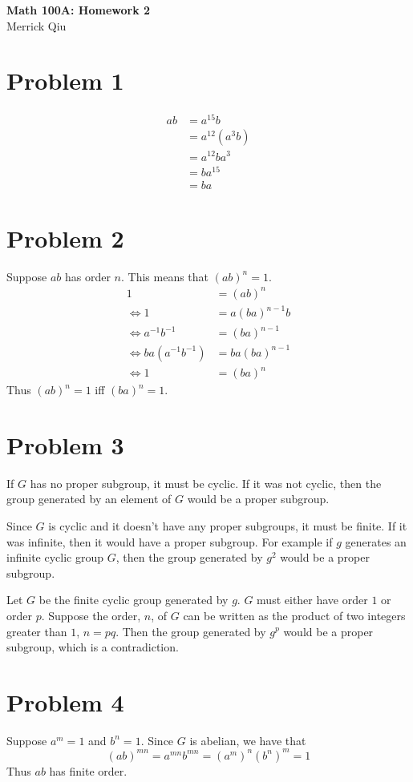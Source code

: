 \documentclass{article}
\begin{document}
\begin{center}
	\huge{\bf Math 100A: Homework 2} \\
	Merrick Qiu
\end{center}

\section*{Problem 1}
\begin{align*}
	ab &= a^{15}b \\
	&= a^{12}(a^3b) \\
	&= a^{12}ba^3 \\
	&= ba^{15} \\
	&= ba
\end{align*}

\section*{Problem 2}
Suppose $ab$ has order $n$. 
This means that $(ab)^n = 1$.
\begin{align*}
	1 &= (ab)^n \\
	\iff 1 &= a(ba)^{n-1}b \\
	\iff a^{-1}b^{-1} &= (ba)^{n-1} \\
	\iff ba(a^{-1}b^{-1}) &= ba(ba)^{n-1} \\
	\iff 1 &= (ba)^n
\end{align*}
Thus $(ab)^n = 1$ iff $(ba)^n = 1$.

\section*{Problem 3}
If $G$ has no proper subgroup, it must be cyclic.
If it was not cyclic, then the group generated by an element of $G$
would be a proper subgroup.

Since $G$ is cyclic and it doesn't have any proper subgroups, it must be finite.
If it was infinite, then it would have a proper subgroup.
For example if $g$ generates an infinite cyclic group $G$, then the group generated by $g^2$ 
would be a proper subgroup.

Let $G$ be the finite cyclic group generated by $g$.
$G$ must either have order $1$ or order $p$.
Suppose the order, $n$, of $G$ can be written as the product of two integers greater than $1$,
$n=pq$.
Then the group generated by $g^p$ would be a proper subgroup,
which is a contradiction.

\section*{Problem 4}
Suppose $a^m = 1$ and $b^n = 1$.
Since $G$ is abelian, we have that 
\[
	(ab)^{mn} = a^{mn}b^{mn} = (a^m)^n (b^n)^m = 1
\]
Thus $ab$ has finite order.
\end{document}
